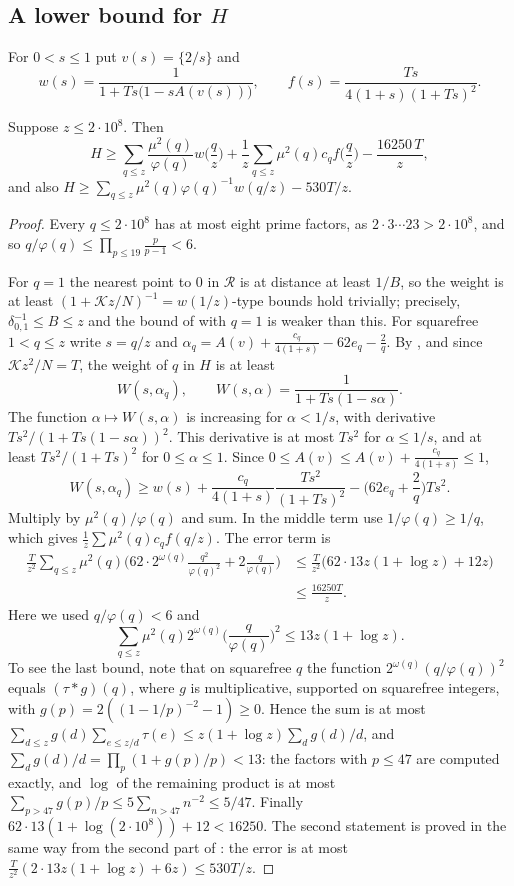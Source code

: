 \documentclass[11pt,colorlinks]{charlie}
\newcommand{\cR}{\mathcal R}
\newcommand{\Ka}{\mathcal K}
\begin{document}
\subsection{A lower bound for $H$}
For $0<s\le1$ put $v(s)=\{2/s\}$ and
\[
 w(s)=\frac1{1+Ts\big(1-sA(v(s))\big)},\qquad f(s)=\frac{Ts}{4(1+s)(1+Ts)^2}.
\]

\begin{proposition}\label{prop:H}
Suppose $z\le2\cdot10^8$. Then
\[
 H\ge\sum_{q\le z}\frac{\mu^2(q)}{\varphi(q)}w\Big(\frac qz\Big)+\frac1z\sum_{q\le z}\mu^2(q)c_qf\Big(\frac qz\Big)-\frac{16250\,T}z,
\]
and also $H\ge\sum_{q\le z}\mu^2(q)\varphi(q)^{-1}w(q/z)-530T/z$.
\end{proposition}
\begin{proof}
Every $q\le2\cdot10^8$ has at most eight prime factors, as $2\cdot3\cdots23>2\cdot10^8$, and so $q/\varphi(q)\le\prod_{p\le19}\frac p{p-1}<6$.

For $q=1$ the nearest point to $0$ in $\cR$ is at distance at least $1/B$, so the weight is at least $(1+\Ka z/N)^{-1}=w(1/z)$-type bounds hold trivially; precisely, $\delta_{0,1}^{-1}\le B\le z$ and the bound of  with $q=1$ is weaker than this. For squarefree $1<q\le z$ write $s=q/z$ and $\alpha_q=A(v)+\frac{c_q}{4(1+s)}-62e_q-\frac2q$. By , and since $\Ka z^2/N=T$, the weight of $q$ in $H$ is at least
\[
 W(s,\alpha_q),\qquad W(s,\alpha)=\frac1{1+Ts(1-s\alpha)} .
\]
The function $\alpha\mapsto W(s,\alpha)$ is increasing for $\alpha<1/s$, with derivative $Ts^2/(1+Ts(1-s\alpha))^2$. This derivative is at most $Ts^2$ for $\alpha\le1/s$, and at least $Ts^2/(1+Ts)^2$ for $0\le\alpha\le1$. Since $0\le A(v)\le A(v)+\frac{c_q}{4(1+s)}\le1$,
\[
 W(s,\alpha_q)\ge w(s)+\frac{c_q}{4(1+s)}\frac{Ts^2}{(1+Ts)^2}-\Big(62e_q+\frac2q\Big)Ts^2 .
\]
Multiply by $\mu^2(q)/\varphi(q)$ and sum. In the middle term use $1/\varphi(q)\ge1/q$, which gives $\frac1z\sum\mu^2(q)c_qf(q/z)$. The error term is
\begin{align*}
 \frac T{z^2}\sum_{q\le z}\mu^2(q)\Big(62\cdot2^{\omega(q)}\frac{q^2}{\varphi(q)^2}+2\frac q{\varphi(q)}\Big)&\le\frac T{z^2}\big(62\cdot13z(1+\log z)+12z\big)\\
 &\le\frac{16250T}z .
\end{align*}
Here we used $q/\varphi(q)<6$ and
\[
 \sum_{q\le z}\mu^2(q)2^{\omega(q)}\Big(\frac q{\varphi(q)}\Big)^2\le13z(1+\log z).
\]
To see the last bound, note that on squarefree $q$ the function $2^{\omega(q)}(q/\varphi(q))^2$ equals $(\tau*g)(q)$, where $g$ is multiplicative, supported on squarefree integers, with $g(p)=2((1-1/p)^{-2}-1)\ge0$. Hence the sum is at most $\sum_{d\le z}g(d)\sum_{e\le z/d}\tau(e)\le z(1+\log z)\sum_dg(d)/d$, and $\sum_dg(d)/d=\prod_p(1+g(p)/p)<13$: the factors with $p\le47$ are computed exactly, and $\log$ of the remaining product is at most $\sum_{p>47}g(p)/p\le5\sum_{n>47}n^{-2}\le5/47$. Finally $62\cdot13(1+\log(2\cdot10^8))+12<16250$. The second statement is proved in the same way from the second part of : the error is at most $\frac T{z^2}(2\cdot13z(1+\log z)+6z)\le530T/z$.
\end{proof}
\end{document}

